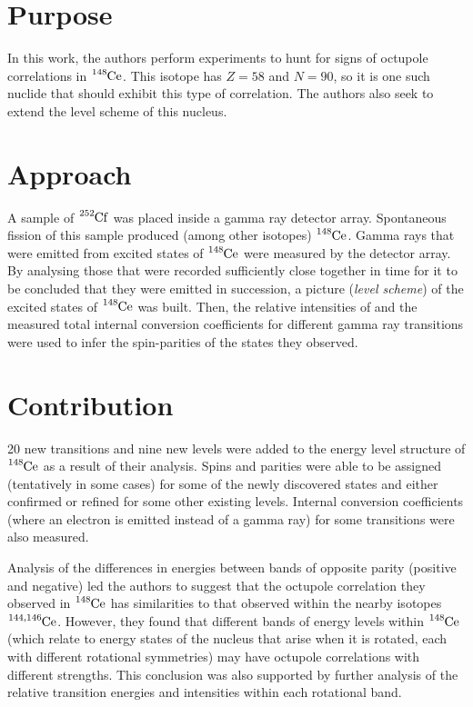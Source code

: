 \documentclass[12pt,a4paper]{article}
\begin{document}
\section*{Purpose}
In this work, the authors perform experiments to hunt for signs of octupole correlations in $\ce{^{148}Ce}$. This isotope has $Z = 58$ and $N = 90$, so it is one such nuclide that should exhibit this type of correlation. The authors also seek to extend the level scheme of this nucleus.


\section*{Approach}
A sample of $\ce{^{252}Cf}$ was placed inside a gamma ray detector array. Spontaneous fission of this sample produced (among other isotopes) $\ce{^{148}Ce}$. Gamma rays that were emitted from excited states of $\ce{^{148}Ce}$  were measured by the detector array. By analysing those that were recorded sufficiently close together in time for it to be concluded that they were emitted in succession, a picture (\textit{level scheme}) of the excited states of $\ce{^{148}Ce}$ was built. Then, the relative intensities of and the measured total internal conversion coefficients for different gamma ray transitions were used to infer the spin-parities of the states they observed.

\section*{Contribution}
20 new transitions and nine new levels were added to the energy level structure of $\ce{^{148}Ce}$ as a result of their analysis. Spins and parities were able to be assigned (tentatively in some cases) for some of the newly discovered states and either confirmed or refined for some other existing levels. Internal conversion coefficients (where an electron is emitted instead of a gamma ray) for some transitions were also measured. 

\medskip
Analysis of the differences in energies between bands of opposite parity (positive and negative) led the authors to suggest that the octupole correlation they observed in $\ce{^{148}Ce}$ has similarities to that observed within the nearby isotopes $\ce{^{144,146}Ce}$. However, they found that different bands of energy levels within $\ce{^{148}Ce}$ (which relate to energy states of the nucleus that arise when it is rotated, each with different rotational symmetries) may have octupole correlations with different strengths. This conclusion was also supported by further analysis of the relative transition energies and intensities within each rotational band. 
\end{document}
